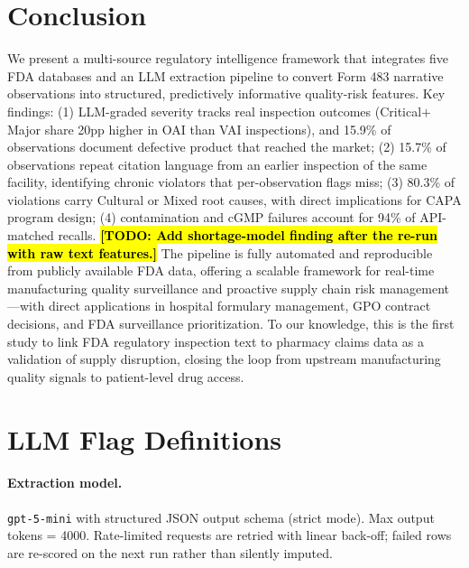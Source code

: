 \documentclass[12pt]{article}
\newcommand{\todo}[1]{\hl{\textbf{[TODO: #1]}}}
\begin{document}
\section{Conclusion}
\label{sec:conclusion}

We present a multi-source regulatory intelligence framework that integrates
five FDA databases and an LLM extraction pipeline to convert Form 483
narrative observations into structured, predictively informative quality-risk
features.
Key findings: (1) LLM-graded severity tracks real inspection outcomes
(Critical$+$Major share 20pp higher in OAI than VAI inspections), and 15.9\%
of observations document defective product that reached the market;
(2) 15.7\% of observations repeat citation language from an earlier
inspection of the same facility, identifying chronic violators that
per-observation flags miss; (3) 80.3\% of violations carry Cultural or
Mixed root causes, with direct implications for CAPA program design;
(4) contamination and cGMP failures account for 94\% of API-matched recalls.
\todo{Add shortage-model finding after the re-run with raw text features.}
The pipeline is fully automated and reproducible from publicly available FDA
data, offering a scalable framework for real-time manufacturing quality
surveillance and proactive supply chain risk management---with direct
applications in hospital formulary management, GPO contract decisions, and
FDA surveillance prioritization.
To our knowledge, this is the first study to link FDA regulatory inspection
text to pharmacy claims data as a validation of supply disruption, closing
the loop from upstream manufacturing quality signals to patient-level drug
access.




\appendix

\section{LLM Flag Definitions}
\label{app:flags}

\paragraph{Extraction model.} \texttt{gpt-5-mini} with structured JSON output
schema (strict mode). Max output tokens = 4000. Rate-limited requests are
retried with linear back-off; failed rows are re-scored on the next run
rather than silently imputed.
\end{document}
